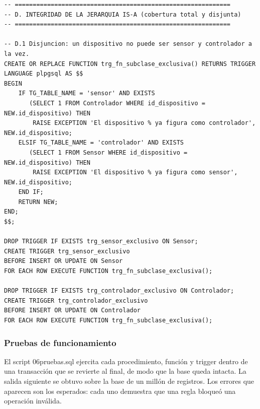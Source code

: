 \documentclass[11pt,letterpaper]{article}
\newcommand{\tbus}{\textunderscore\allowbreak}
\newcommand{\tb}[1]{{\ttfamily\let\_\tbus #1}}
\begin{document}
\begin{lstlisting}[style=sql]
-- ============================================================
-- D. INTEGRIDAD DE LA JERARQUIA IS-A (cobertura total y disjunta)
-- ============================================================

-- D.1 Disjuncion: un dispositivo no puede ser sensor y controlador a la vez.
CREATE OR REPLACE FUNCTION trg_fn_subclase_exclusiva() RETURNS TRIGGER
LANGUAGE plpgsql AS $$
BEGIN
    IF TG_TABLE_NAME = 'sensor' AND EXISTS
       (SELECT 1 FROM Controlador WHERE id_dispositivo = NEW.id_dispositivo) THEN
        RAISE EXCEPTION 'El dispositivo % ya figura como controlador', NEW.id_dispositivo;
    ELSIF TG_TABLE_NAME = 'controlador' AND EXISTS
       (SELECT 1 FROM Sensor WHERE id_dispositivo = NEW.id_dispositivo) THEN
        RAISE EXCEPTION 'El dispositivo % ya figura como sensor', NEW.id_dispositivo;
    END IF;
    RETURN NEW;
END;
$$;

DROP TRIGGER IF EXISTS trg_sensor_exclusivo ON Sensor;
CREATE TRIGGER trg_sensor_exclusivo
BEFORE INSERT OR UPDATE ON Sensor
FOR EACH ROW EXECUTE FUNCTION trg_fn_subclase_exclusiva();

DROP TRIGGER IF EXISTS trg_controlador_exclusivo ON Controlador;
CREATE TRIGGER trg_controlador_exclusivo
BEFORE INSERT OR UPDATE ON Controlador
FOR EACH ROW EXECUTE FUNCTION trg_fn_subclase_exclusiva();
\end{lstlisting}


\subsubsection{Pruebas de funcionamiento}
\label{sec:pruebas}

El script \tb{06\_pruebas.sql} ejercita cada procedimiento, función y trigger dentro de una transacción que se revierte al final, de modo que la base queda intacta. La salida siguiente se obtuvo sobre la base de un millón de registros. Los errores que aparecen son los esperados: cada uno demuestra que una regla bloqueó una operación inválida.
\end{document}

